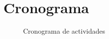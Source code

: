 
\section{Cronograma}

\begin{figure}[H]
  \centering
  \scalebox{0.8}{}
  \caption{Cronograma de actividades}
  \label{fig:cronograma}
\end{figure}
\pagebreak
